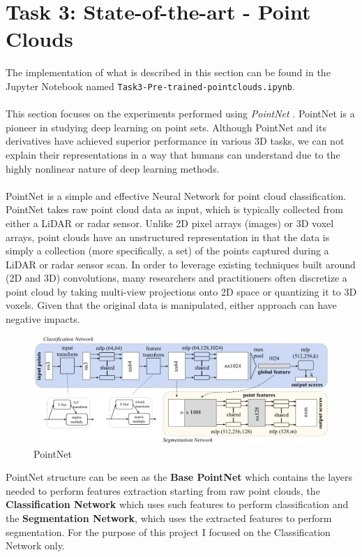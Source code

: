 \documentclass[11pt,a4paper]{article}
\begin{document}
\newpage
\section{Task 3: State-of-the-art - Point Clouds}
The implementation of what is described in this section can be found in the Jupyter Notebook named \texttt{Task3-Pre-trained-pointclouds.ipynb}.\\
\\
This section focuses on the experiments performed using \textit{PointNet} \cite{qi2017pointnet}. PointNet is a pioneer in studying deep learning on point sets. Although PointNet and its derivatives \cite{DBLP:journals/corr/abs-1807-00652} \cite{qi2017pointnetplus} \cite{DBLP:journals/corr/abs-1711-08588} \cite{DBLP:journals/corr/abs-1801-06761} have achieved superior performance in various 3D tasks, we can not explain their representations in a way that humans can understand due to the highly nonlinear nature of deep learning methods.\\
\\
PointNet is a simple and effective Neural Network for point cloud classification. PointNet takes raw point cloud data as input, which is typically collected from either a LiDAR or radar sensor. Unlike 2D pixel arrays (images) or 3D voxel arrays, point clouds have an unstructured representation in that the data is simply a collection (more specifically, a set) of the points captured during a LiDAR or radar sensor scan. In order to leverage existing techniques built around (2D and 3D) convolutions, many researchers and practitioners often discretize a point cloud by taking multi-view projections onto 2D space or quantizing it to 3D voxels. Given that the original data is manipulated, either approach can have negative impacts.
\begin{figure}[H]
    \centering
    \includegraphics[scale=0.30]{imgs/pointnet-model.png}
    \caption{PointNet}
\end{figure}
\noindent
PointNet structure can be seen as the \textbf{Base PointNet} which contains the layers needed to perform features extraction starting from raw point clouds, the \textbf{Classification Network} which uses such features to perform classification and the \textbf{Segmentation Network}, which uses the extracted features to perform segmentation. For the purpose of this project I focused on the Classification Network only.\\
\end{document}
